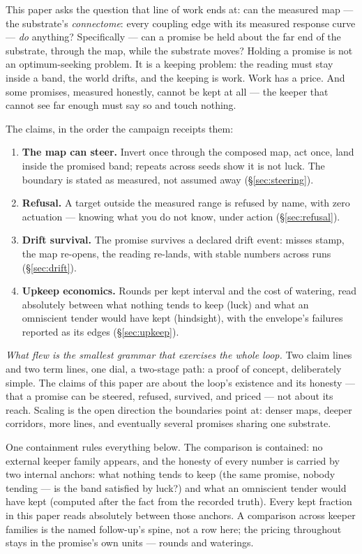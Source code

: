 \documentclass[11pt,a4paper]{article}
\begin{document}
This paper asks the question that line of work ends at: can the
measured map --- the substrate's \emph{connectome}: every coupling
edge with its measured response curve --- \emph{do} anything?
Specifically --- can a promise be held about the
far end of the substrate, through the map, while the substrate moves?
Holding a promise is not an optimum-seeking problem. It is a keeping
problem: the reading must stay inside a band, the world drifts, and
the keeping is work. Work has a price. And some promises, measured
honestly, cannot be kept at all --- the keeper that cannot see far
enough must say so and touch nothing.

The claims, in the order the campaign receipts them:

\begin{enumerate}
\item \textbf{The map can steer.} Invert once through the composed
map, act once, land inside the promised band; repeats across seeds
show it is not luck. The boundary is stated as measured, not assumed
away (\S\ref{sec:steering}).
\item \textbf{Refusal.} A target outside the measured range is
refused by name, with zero actuation --- knowing what you do not
know, under action (\S\ref{sec:refusal}).
\item \textbf{Drift survival.} The promise survives a declared drift
event: misses stamp, the map re-opens, the reading re-lands, with
stable numbers across runs (\S\ref{sec:drift}).
\item \textbf{Upkeep economics.} Rounds per kept interval and the
cost of watering, read absolutely between what nothing tends to keep
(luck) and what an omniscient tender would have kept (hindsight),
with the envelope's failures reported as its
edges (\S\ref{sec:upkeep}).
\end{enumerate}

\emph{What flew is the smallest grammar that exercises the whole
loop.} Two claim lines and two term lines, one dial, a two-stage
path: a proof of concept, deliberately simple. The claims of this
paper are about the loop's existence and its honesty --- that a
promise can be steered, refused, survived, and priced --- not about
its reach. Scaling is the open direction the boundaries point at:
denser maps, deeper corridors, more lines, and eventually several
promises sharing one substrate.

One containment rules everything below. The comparison is contained:
no external keeper family appears, and the honesty of every number is carried by two internal anchors:
what nothing tends to keep (the same promise, nobody tending --- is
the band satisfied by luck?) and what an omniscient tender would
have kept (computed after the fact from the recorded truth). Every
kept fraction in this paper reads
absolutely between those anchors. A
comparison across keeper families is the named follow-up's spine,
not a row here; the pricing throughout stays in the promise's own
units --- rounds and waterings.
\end{document}
